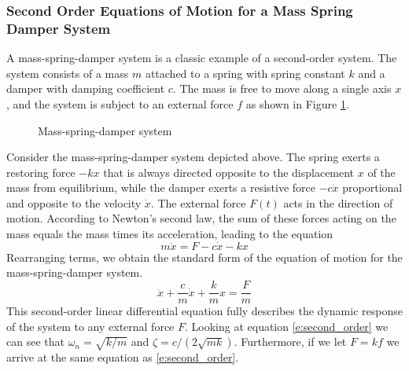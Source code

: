 \subsubsection{Second Order Equations of Motion for a Mass Spring Damper System}

A mass-spring-damper system is a classic example of a second-order system. The system consists of a mass $m$ attached to a spring with spring constant $k$ and a damper with damping coefficient $c$. The mass is free to move along a single axis $x$, and the system is subject to an external force $f$ as shown in Figure \ref{f:msd}.

\begin{figure}[H]
    \centering
    \caption{Mass-spring-damper system}
    \label{f:msd}
\end{figure}

Consider the mass-spring-damper system depicted above. The spring exerts a restoring force $-kx$ that is always directed opposite to the displacement $x$ of the mass from equilibrium, while the damper exerts a resistive force $-c\dot{x}$ proportional and opposite to the velocity $\dot{x}$. The external force $F(t)$ acts in the direction of motion. According to Newton's second law, the sum of these forces acting on the mass equals the mass times its acceleration, leading to the equation 
\begin{equation}
m\ddot{x} = F - c\dot{x} - kx 
\end{equation}
Rearranging terms, we obtain the standard form of the equation of motion for the mass-spring-damper system.
\begin{equation}
\ddot{x} + \frac{c}{m}\dot{x} + \frac{k}{m}x = \frac{F}{m}
\end{equation}
This second-order linear differential equation fully describes the dynamic response of the system to any external force $F$. Looking at equation \ref{e:second_order} we can see that $\omega_n = \sqrt{k/m}$ and $\zeta = c/(2\sqrt{mk})$. Furthermore, if we let $F = kf$ we arrive at the same equation as \ref{e:second_order}.

